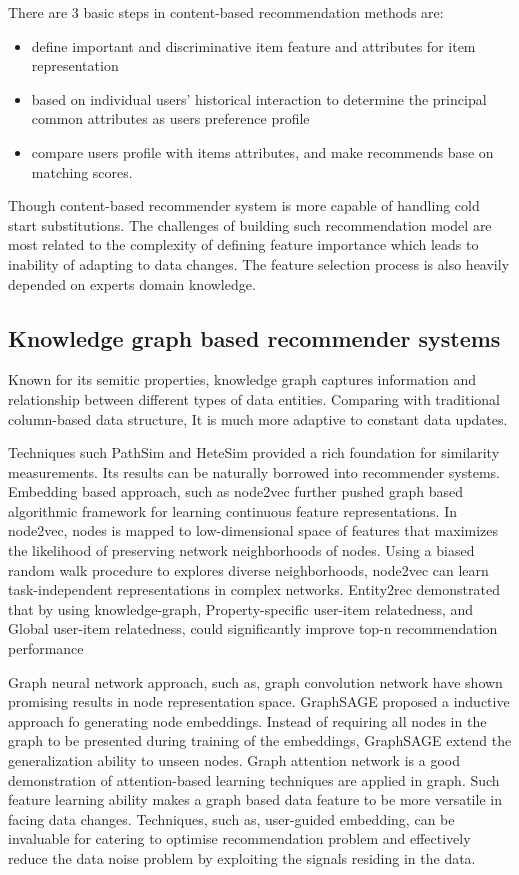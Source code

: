 There are 3 basic steps in content-based recommendation methods are: 
\begin{itemize}
    \item define important and discriminative item feature and attributes for item representation
    \item based on individual users' historical interaction to determine the principal common attributes as users preference profile
    \item compare users profile with items attributes, and make recommends base on matching scores.
\end{itemize}

Though content-based recommender system is more capable of handling cold start substitutions. The challenges of building such recommendation model are most related to the complexity of defining feature importance which leads to inability of adapting to data changes. The feature selection process is also heavily depended on experts domain knowledge. 

\subsection{Knowledge graph based recommender systems}
Known for its semitic properties, knowledge graph captures information and relationship between different types of data entities. Comparing with traditional column-based data structure, It is much more adaptive to constant data updates. 

Techniques such PathSim \citep{Sun2011PathSim} and HeteSim \citep{Shi2013HeteSim} provided a rich foundation for similarity measurements. Its results can be naturally borrowed into recommender systems. 
Embedding based approach, such as node2vec \citep{grover2016node2vec} further pushed graph based algorithmic framework for learning continuous feature representations. In node2vec, nodes is mapped to low-dimensional space of features that maximizes the likelihood of preserving network neighborhoods of nodes. Using a biased random walk procedure to explores diverse neighborhoods, node2vec can learn task-independent representations in complex networks. 
Entity2rec \citep{palumbo2017entity2rec} demonstrated that by using knowledge-graph, Property-specific user-item relatedness, and Global user-item relatedness, could significantly improve top-n recommendation performance

Graph neural network approach, such as, graph convolution network \citep{kipf2016semi} have shown promising results in node representation space. 
GraphSAGE \citep{hamilton2017inductive} proposed a inductive approach fo generating node embeddings. Instead of requiring all nodes in the graph to be presented during training of the embeddings, GraphSAGE extend the generalization ability to unseen nodes. 
Graph attention network \citep{lee2018graph} is a good demonstration of attention-based learning techniques are applied in graph. Such feature learning ability makes a graph based data feature to be more versatile in facing data changes. 
Techniques, such as, user-guided embedding, can be invaluable for catering to optimise recommendation problem and effectively reduce the data noise problem by exploiting the signals residing in the data.

